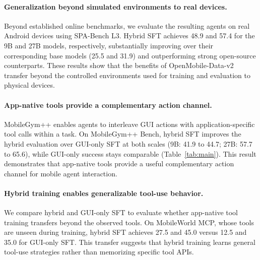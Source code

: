 \vspace{-2mm}
\paragraph{Generalization beyond simulated environments to real devices.}
Beyond established online benchmarks, we evaluate the resulting agents on real Android devices using SPA-Bench L3. Hybrid SFT achieves 48.9 and 57.4 for the 9B and 27B models, respectively, substantially improving over their corresponding base models (25.5 and 31.9) and outperforming strong open-source counterparts. These results show that the benefits of OpenMobile-Data-v2 transfer beyond the controlled environments used for training and evaluation to physical devices.

\vspace{-2mm}
\paragraph{App-native tools provide a complementary action channel.}
MobileGym++ enables agents to interleave GUI actions with application-specific tool calls within a task. On MobileGym++ Bench, hybrid SFT improves the hybrid evaluation over GUI-only SFT at both scales (9B: 41.9 to 44.7; 27B: 57.7 to 65.6), while GUI-only success stays comparable (Table~\ref{tab:main}). This result demonstrates that app-native tools provide a useful complementary action channel for mobile agent interaction.

\vspace{-2mm}
\paragraph{Hybrid training enables generalizable tool-use behavior.}
We compare hybrid and GUI-only SFT to evaluate whether app-native tool training transfers beyond the observed tools. On MobileWorld MCP, whose tools are unseen during training, hybrid SFT achieves 27.5 and 45.0 versus 12.5 and 35.0 for GUI-only SFT. This transfer suggests that hybrid training learns general tool-use strategies rather than memorizing specific tool APIs.






\label{sec:exp-gui}

